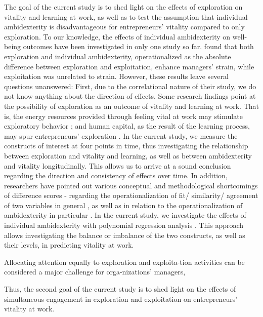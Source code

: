 \documentclass[man, 12pt, a4paper, noextraspace]{apa6}
\begin{document}
The goal of the current study is to shed light on the effects of exploration on vitality and learning at work, as well as to test the assumption that individual ambidexterity is disadvantageous for entrepreneurs' vitality compared to only exploration.  
To our knowledge, the effects of individual ambidexterity on well-being outcomes have been investigated in only one study so far.
\textcite{Keller2015} found that both exploration and individual ambidexterity, operationalized as the absolute difference between exploration and exploitation, enhance managers' strain, while exploitation was unrelated to strain.
However, these results leave several questions unanswered: First, due to the correlational nature of their study, we do not know anything about the direction of effects. 
Some research findings point at the possibility of exploration as an outcome of vitality and learning at work.
That is, the energy resources provided through feeling vital at work may stimulate exploratory behavior \parencite[e.g.,][]{Carmeli2009}; and human capital, as the result of the learning process, may spur entrepreneurs' exploration \parencite[e.g.,][]{Marin-Idarraga2016}.
In the current study, we measure the constructs of interest at four points in time, thus investigating the relationship between exploration and vitality and learning, as well as between ambidexterity and vitality longitudinally. 
This allows us to arrive at a sound conclusion regarding the direction and consistency of effects over time.  
In addition, researchers have pointed out various conceptual and methodological shortcomings of difference scores - regarding the operationalization of fit/ similarity/ agreement of two variables in general \parencite[e.g.,][]{Edwards.1993a, Edwards2001}, as well as in relation to the operationalization of ambidexterity in particular \parencite{Rosing.2017}.
In the current study, we investigate the effects of individual ambidexterity with polynomial regression analysis \parencite[PRA;][]{Edwards1994}. 
This approach allows investigating the balance or imbalance of the two constructs, as well as their levels, in predicting vitality at work.  





Allocating attention equally to exploration and exploita-tion activities can be considered a major challenge for orga-nizations’ managers, 



Thus, the second goal of the current study is to shed light on the effects of simultaneous engagement in exploration and exploitation on entrepreneurs' vitality at work. \par
\end{document}
